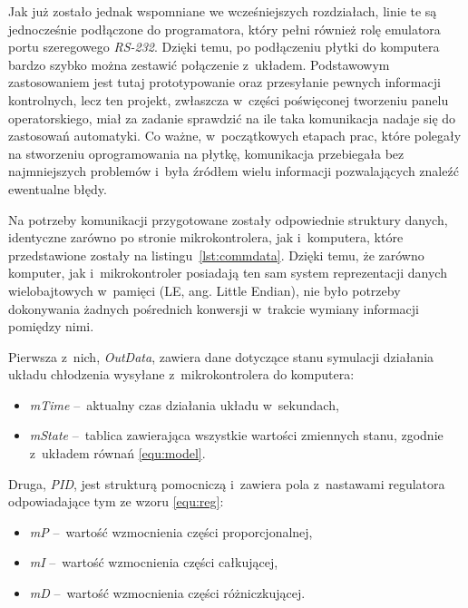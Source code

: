 Jak już zostało jednak wspomniane we wcześniejszych rozdziałach, linie te są
jednocześnie podłączone do programatora, który pełni również rolę emulatora
portu szeregowego \textit{RS-232}. Dzięki temu, po podłączeniu płytki do
komputera bardzo szybko można zestawić połączenie z~układem. Podstawowym
zastosowaniem jest tutaj prototypowanie oraz przesyłanie pewnych informacji
kontrolnych, lecz ten projekt, zwłaszcza w~części poświęconej tworzeniu panelu
operatorskiego, miał za zadanie sprawdzić na ile taka komunikacja nadaje się do
zastosowań automatyki. Co ważne, w~początkowych etapach prac, które polegały na
stworzeniu oprogramowania na płytkę, komunikacja przebiegała bez najmniejszych
problemów i~była źródłem wielu informacji pozwalających znaleźć ewentualne
błędy.

Na potrzeby komunikacji przygotowane zostały odpowiednie struktury danych,
identyczne zarówno po stronie mikrokontrolera, jak i~komputera, które
przedstawione zostały na listingu~\ref{lst:commdata}. Dzięki temu, że zarówno
komputer, jak i~mikrokontroler posiadają ten sam system reprezentacji danych
wielobajtowych w~pamięci (LE, ang. Little Endian), nie było potrzeby dokonywania
żadnych pośrednich konwersji w~trakcie wymiany informacji pomiędzy nimi.

\begin{figure}[!ht]
    
\end{figure}
Pierwsza z~nich, \textit{OutData}, zawiera dane dotyczące stanu symulacji
działania układu chłodzenia wysyłane z~mikrokontrolera do komputera:
\begin{itemize}
    \item \textit{mTime} --~aktualny czas działania układu w~sekundach,
    \item \textit{mState} --~tablica zawierająca wszystkie wartości zmiennych
    stanu, zgodnie z~układem równań \eqref{equ:model}.
\end{itemize}

Druga, \textit{PID}, jest strukturą pomocniczą i~zawiera pola z~nastawami
regulatora odpowiadające tym ze wzoru \eqref{equ:reg}:
\begin{itemize}
    \item \textit{mP} --~wartość wzmocnienia części proporcjonalnej,
    \item \textit{mI} --~wartość wzmocnienia części całkującej,
    \item \textit{mD} --~wartość wzmocnienia części różniczkującej.
\end{itemize}

